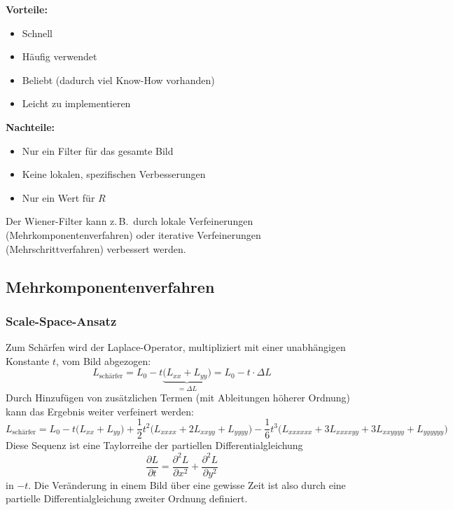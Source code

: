 \documentclass[a4paper, 11pt, accentcolor = tud3b]{tudreport}
\newcommand{\zB}{z.\,B.~}
\begin{document}
				\textbf{Vorteile:}
				\begin{itemize}
					\item Schnell
					\item Häufig verwendet
					\item Beliebt (dadurch viel Know-How vorhanden)
					\item Leicht zu implementieren
				\end{itemize}
				\textbf{Nachteile:}
				\begin{itemize}
					\item Nur ein Filter für das gesamte Bild
					\item Keine lokalen, spezifischen Verbesserungen
					\item Nur ein Wert für \(R\)
				\end{itemize}
				Der Wiener-Filter kann \zB durch lokale Verfeinerungen (Mehrkomponentenverfahren) oder iterative Verfeinerungen (Mehrschrittverfahren) verbessert werden.

			\subsection{Mehrkomponentenverfahren}
				\subsubsection{Scale-Space-Ansatz}
					Zum Schärfen wird der Laplace-Operator, multipliziert mit einer unabhängigen Konstante \(t\), vom Bild abgezogen:
					\begin{equation*}
						L_\text{schärfer} = L_0 - t \underbrace{\big( L_{xx} + L_{yy} \big)}_{= \Delta L} = L_0 - t \cdot \Delta L
					\end{equation*}
					Durch Hinzufügen von zusätzlichen Termen (mit Ableitungen höherer Ordnung) kann das Ergebnis weiter verfeinert werden:
					\begin{equation*}
						L_\text{schärfer} = L_0 - t \big( L_{xx} + L_{yy} \big) + \frac{1}{2} t^2 \big( L_{xxxx} + 2L_{xxyy} + L_{yyyy} \big) - \frac{1}{6} t^3 \big( L_{xxxxxx} + 3L_{xxxxyy} + 3L_{xxyyyy} + L_{yyyyyy} \big)
					\end{equation*}
					Diese Sequenz ist eine Taylorreihe der partiellen Differentialgleichung
					\begin{equation*}
						\frac{\partial L}{\partial t} = \frac{\partial^2 L}{\partial x^2} + \frac{\partial^2 L}{\partial y^2}
					\end{equation*}
					in \(-t\). Die Veränderung in einem Bild über eine gewisse Zeit ist also durch eine partielle Differentialgleichung zweiter Ordnung definiert.
\end{document}
